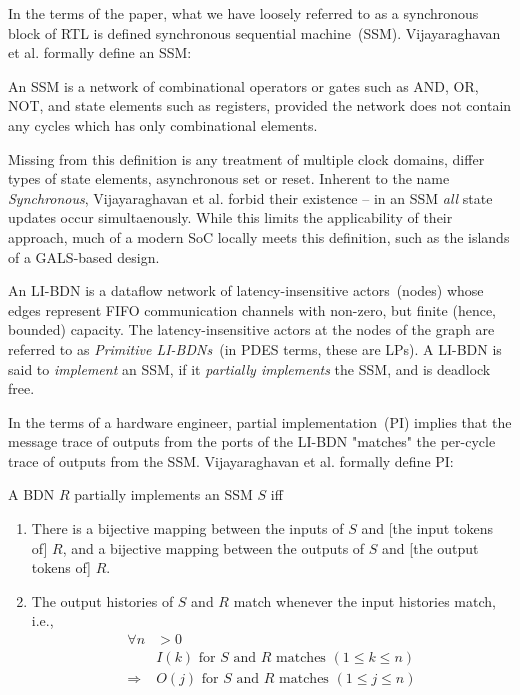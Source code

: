 In the terms of the paper, what we have loosely referred to as a synchronous
block of RTL is defined synchronous sequential machine~(SSM). Vijayaraghavan et
al.\cite{LIBDN} formally define an SSM:

\begin{widequote}
An SSM is a network of combinational operators or gates
such as AND, OR, NOT, and state elements such as registers,
provided the network does not contain any cycles which has
only combinational elements.
\end{widequote}

Missing from this definition is any treatment of multiple clock domains, differ
types of state elements, asynchronous set or reset.  Inherent to the name
\emph{Synchronous}, Vijayaraghavan et al. forbid their existence -- in an SSM
\emph{all} state updates occur simultaenously. While this limits the
applicability of their approach, much of a modern SoC locally meets this
definition, such as the islands of a GALS-based design.

An LI-BDN is a dataflow network of latency-insensitive actors~(nodes) whose
edges represent FIFO communication channels with non-zero, but finite (hence,
bounded) capacity. The latency-insensitive actors at the nodes of the graph are
referred to as \emph{Primitive LI-BDNs}~(in PDES terms, these are LPs). A
LI-BDN is said to \emph{implement} an SSM, if it \emph{partially implements}
the SSM, and is deadlock free.

In the terms of a hardware engineer, partial implementation~(PI) implies that
the message trace of outputs from the ports of the LI-BDN "matches" the
per-cycle trace of outputs from the SSM. Vijayaraghavan et al.\cite{LIBDN}
formally define PI:

\begin{widequote}
A BDN $R$ partially implements an SSM $S$ iff
\begin{enumerate}
\item There is a bijective mapping between the inputs of $S$ and
[the input tokens of] $R$, and a bijective mapping between the outputs of $S$ and
[the output tokens of] $R$.
\item The output histories of $S$ and $R$ match whenever the
input histories match, i.e.,
\begin{align*}
\forall n &> 0\\
&\text{$I(k)$ for $S$ and $R$ matches $(1 \leq k \leq n)$}\\
\Rightarrow &\text{$O(j)$ for $S$ and $R$ matches $(1 \leq j \leq n)$}
\end{align*}
\end{enumerate}
\end{widequote}

